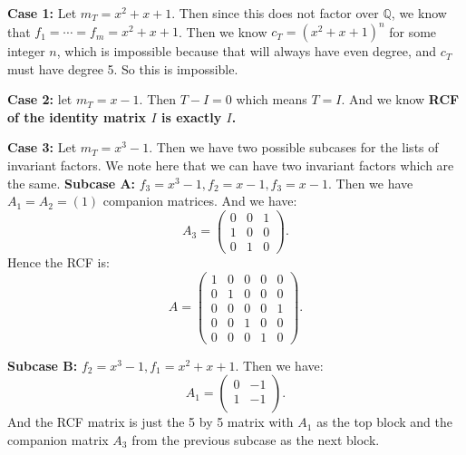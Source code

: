\documentclass[9pt,reqno,twoside]{amsbook}
\theoremstyle{plain}
\numberwithin{section}{chapter}
\numberwithin{equation}{chapter}
\theoremstyle{definition}
\theoremstyle{remark}
\theoremstyle{plain}
\newcommand{\Q}{\mathbb{Q}}
\newcommand{\bb}{\vspace{3mm}}
\newcommand{\lpar}{\left(}
\newcommand{\rpar}{\right)}
\begin{document}
\begin{enumerate}[label=\arabic*.]
\bb
\textbf{Case 1: }Let $m_T = x^2 + x + 1$. Then since this does not factor over $\Q$, we know that $f_1 = \cdots = f_m = x^2 + x + 1$. Then we know $c_T = (x^2 + x + 1)^n$ for some integer $n$, which is impossible because that will always have even degree, and $c_T$ must have degree 5. So this is impossible. 
\bb

\textbf{Case 2: }let $m_T = x - 1$. Then $T - I = 0$ which means $T = I$. And we know \textbf{RCF of the identity matrix $I$ is exactly $I$. }

\bb

\textbf{Case 3: }Let $m_T = x^3 - 1$. Then we have two possible subcases for the lists of invariant factors. We note here that we can have two invariant factors which are the same. 
\textbf{Subcase A: } $f_3 = x^3 - 1,f_2 = x - 1,f_3 = x - 1$. Then we have $A_1 = A_2 = (1)$ companion matrices. And we have:
$$
A_3 = \lpar 
\begin{matrix}
0 & 0 & 1\\
1 & 0 & 0\\
0 & 1 & 0
\end{matrix} \rpar.
$$
Hence the RCF is:
$$
A = \lpar 
\begin{matrix}
1 & 0 & 0 & 0 & 0\\
0 & 1 & 0 & 0 & 0\\
0 & 0 & 0 & 0 & 1\\
0 & 0 & 1 & 0 & 0\\
0 & 0 & 0 & 1 & 0
\end{matrix} \rpar. 
$$

\textbf{Subcase B: } $f_2 = x^3 - 1, f_1 = x^2 + x + 1$. Then we have:
$$
A_1 = \lpar 
\begin{matrix}
0 & -1\\
1 & -1\\
\end{matrix} \rpar.
$$
And the RCF matrix is just the 5 by 5 matrix with $A_1$ as the top block and the companion matrix $A_3$ from the previous subcase as the next block. 













\end{enumerate}
\end{document}
